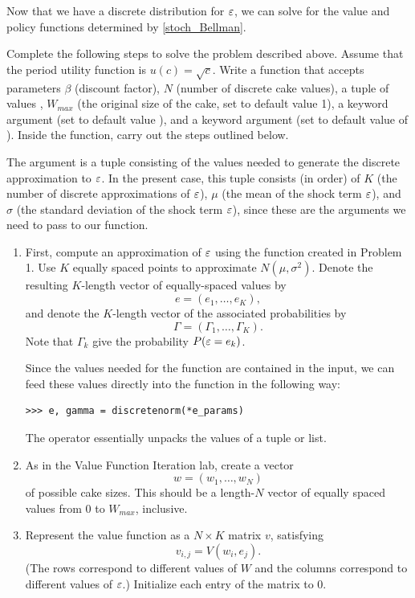 Now that we have a discrete distribution for $\varepsilon$, we can solve for the value and policy functions
determined by \eqref{stoch_Bellman}.

\begin{problem}
Complete the following steps to solve the problem described above.
Assume that the period utility function is $u(c)=\sqrt{c}$.
Write a function 
that accepts parameters $\beta$ (discount factor), $N$ (number of discrete cake values),
a tuple of values , $W_{max}$ (the original size of the cake, set to default value 1),
a keyword argument  (set to default value ), and
a keyword argument  (set to default value of ). Inside the function, carry out the steps
outlined below.

The argument  is a tuple consisting of the values needed to generate
the discrete approximation to $\varepsilon$. In the present case, this tuple consists (in order) of
$K$ (the number of discrete approximations of $\varepsilon$), $\mu$ (the
mean of the shock term $\varepsilon$), and $\sigma$ (the standard deviation of the shock term $\varepsilon$),
since these are the arguments we need to pass to our  function.

\begin{enumerate}
\item First, compute an approximation of $\varepsilon$ using the  function created in Problem 1.
Use $K$ equally spaced points to approximate $N(\mu,\sigma^2)$. Denote the resulting $K$-length
vector of equally-spaced values by
\[e =(e_1,\ldots,e_K),
\]
and denote the $K$-length vector of the associated probabilities
by
\[\Gamma = (\Gamma_1,\ldots,\Gamma_K).
\]
Note that $\Gamma_k$ give the probability $P(\varepsilon = e_k)$.

Since the values needed for the  function are contained in the  input,
we can feed these values directly into the function in the following way:
\begin{lstlisting}
>>> e, gamma = discretenorm(*e_params)
\end{lstlisting}
The \li{*} operator essentially unpacks the values of a tuple or list.

\item As in the Value Function Iteration lab, create a vector
\[w = (w_1,\ldots,w_N)
\]
of possible cake sizes. This should be
a length-$N$ vector of equally spaced values from 0 to $W_{max}$, inclusive.

\item Represent the value function as a $N \times K$ matrix $v$, satisfying
\[
v_{i,j} = V(w_i, e_j).
\]
(The rows correspond to different values of $W$ and the columns correspond to different values of $\varepsilon$.)
Initialize each entry of the matrix to 0.


\end{enumerate}
\end{problem}
